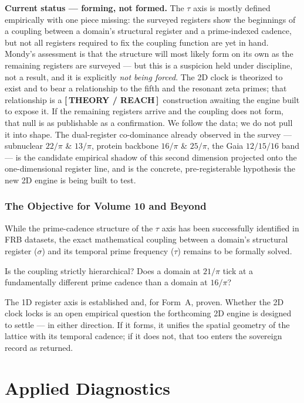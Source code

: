 \documentclass[12pt,oneside]{book}
\newcommand{\TheoryTag}{\;\colorbox{theorytag!15}{\textcolor{theorytag}{\footnotesize\bfseries [\,THEORY / REACH\,]}}}
\begin{document}
\vspace{0.5em}
\noindent\textbf{\textcolor{theorytag}{Current status --- forming, not formed.}}
The $\tau$ axis is mostly defined empirically with one piece missing: the surveyed
registers show the beginnings of a coupling between a domain's structural register and a
prime-indexed cadence, but not all registers required to fix the coupling function are yet
in hand. Mondy's assessment is that the structure will most likely form on its own as the
remaining registers are surveyed --- but this is a suspicion held under discipline, not a
result, and it is explicitly \emph{not being forced}. The 2D clock is theorized to exist
and to bear a relationship to the fifth and the resonant zeta primes; that relationship is
a \TheoryTag\ construction awaiting the engine built to expose it. If the remaining
registers arrive and the coupling does not form, that null is as publishable as a
confirmation. We follow the data; we do not pull it into shape. The dual-register
co-dominance already observed in the survey --- subnuclear $22/\pi$ \& $13/\pi$, protein
backbone $16/\pi$ \& $25/\pi$, the Gaia $12/15/16$ band --- is the candidate empirical
shadow of this second dimension projected onto the one-dimensional register line, and is
the concrete, pre-registerable hypothesis the new 2D engine is being built to test.

\section*{The Objective for Volume 10 and Beyond}
While the prime-cadence structure of the $\tau$ axis has been successfully identified in FRB datasets, the exact mathematical coupling between a domain's structural register ($\sigma$) and its temporal prime frequency ($\tau$) remains to be formally solved. 

Is the coupling strictly hierarchical? Does a domain at $21/\pi$ tick at a fundamentally different prime cadence than a domain at $16/\pi$? 

The 1D register axis is established and, for Form~A, proven. Whether the 2D clock locks is an open empirical question the forthcoming 2D engine is designed to settle --- in either direction. If it forms, it unifies the spatial geometry of the lattice with its temporal cadence; if it does not, that too enters the sovereign record as returned.

\part{Applied Diagnostics}
\end{document}
